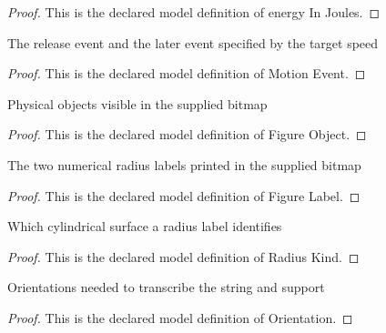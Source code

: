 \begin{proof}
  This is the declared model definition of energy In Joules.
\end{proof}
\begin{definition}
  \label{def:physics:phyx-mini-0780:phyxminiproblems-problemphyxmini0780-motionevent}
  The release event and the later event specified by the target speed
\end{definition}
\begin{proof}
  This is the declared model definition of Motion Event.
\end{proof}
\begin{definition}
  \label{def:physics:phyx-mini-0780:phyxminiproblems-problemphyxmini0780-figureobject}
  Physical objects visible in the supplied bitmap
\end{definition}
\begin{proof}
  This is the declared model definition of Figure Object.
\end{proof}
\begin{definition}
  \label{def:physics:phyx-mini-0780:phyxminiproblems-problemphyxmini0780-figurelabel}
  The two numerical radius labels printed in the supplied bitmap
\end{definition}
\begin{proof}
  This is the declared model definition of Figure Label.
\end{proof}
\begin{definition}
  \label{def:physics:phyx-mini-0780:phyxminiproblems-problemphyxmini0780-radiuskind}
  Which cylindrical surface a radius label identifies
\end{definition}
\begin{proof}
  This is the declared model definition of Radius Kind.
\end{proof}
\begin{definition}[Orientation]
  \label{def:physics:phyx-mini-0780:phyxminiproblems-problemphyxmini0780-orientation}
  Orientations needed to transcribe the string and support
\end{definition}
\begin{proof}
  This is the declared model definition of Orientation.
\end{proof}
